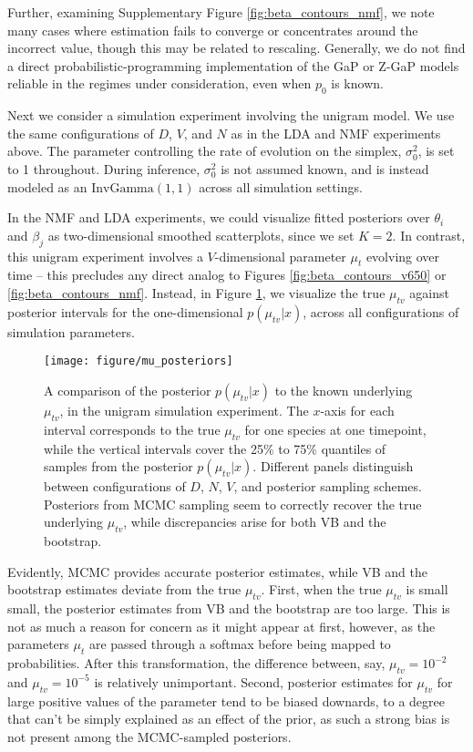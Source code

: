 \documentclass[oupdraft]{bio}
\begin{document}
Further, examining Supplementary Figure \ref{fig:beta_contours_nmf}, we note
many cases where estimation fails to converge or concentrates around the
incorrect value, though this may be related to rescaling. Generally, we do not
find a direct probabilistic-programming implementation of the GaP or Z-GaP
models reliable in the regimes under consideration, even when $p_{0}$ is known.

Next we consider a simulation experiment involving the unigram model. We use the
same configurations of $D$, $V$, and $N$ as in the LDA and NMF experiments
above. The parameter controlling the rate of evolution on the simplex,
$\sigma_{0}^2$, is set to 1 throughout. During inference, $\sigma_0^2$ is not
assumed known, and is instead modeled as an $\text{InvGamma}\left(1, 1\right)$
across all simulation settings.

In the NMF and LDA experiments, we could visualize fitted posteriors over
$\theta_i$ and $\beta_j$ as two-dimensional smoothed scatterplots, since we set
$K = 2$. In contrast, this unigram experiment involves a $V$-dimensional
parameter $\mu_t$ evolving over time -- this precludes any direct analog to
Figures \ref{fig:beta_contours_v650} or \ref{fig:beta_contours_nmf}. Instead, in
Figure \ref{fig:mu_posteriors}, we visualize the true $\mu_{tv}$ against
posterior intervals for the one-dimensional $p\left(\mu_{tv} \vert x\right)$,
across all configurations of simulation parameters.

\begin{figure}[ht]
  \centering
  \texttt{[image: figure/mu\_posteriors]}
  \caption{
    A comparison of the posterior $p\left(\mu_{tv} \vert x\right)$ to the known
    underlying $\mu_{tv}$, in the unigram simulation experiment. The $x$-axis
    for each interval corresponds to the true $\mu_{tv}$ for one species at one
    timepoint, while the vertical intervals cover the 25\% to 75\% quantiles of
    samples from the posterior $p\left(\mu_{tv} \vert x\right)$. Different
    panels distinguish between configurations of $D$, $N$, $V$, and posterior
    sampling schemes. Posteriors from MCMC sampling seem to correctly recover
    the true underlying $\mu_{tv}$, while discrepancies arise for both VB and
    the bootstrap.
    \label{fig:mu_posteriors} }
\end{figure}

Evidently, MCMC provides accurate posterior estimates, while VB and the
bootstrap estimates deviate from the true $\mu_{tv}$. First, when the true
$\mu_{tv}$ is small small, the posterior estimates from VB and the bootstrap are
too large. This is not as much a reason for concern as it might appear at first,
however, as the parameters $\mu_t$ are passed through a softmax before being
mapped to probabilities. After this transformation, the difference between, say,
$\mu_{tv} = 10^{-2}$ and $\mu_{tv} = 10^{-5}$ is relatively unimportant. Second,
posterior estimates for $\mu_{tv}$ for large positive values of the parameter
tend to be biased downards, to a degree that can't be simply explained as an
effect of the prior, as such a strong bias is not present among the MCMC-sampled
posteriors.
\end{document}
